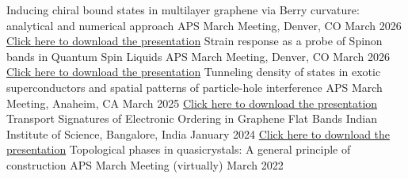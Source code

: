 \begin{cventries}
{Inducing chiral bound states in multilayer graphene via Berry curvature: analytical and numerical approach} %
{APS March Meeting, Denver, CO} %
{March 2026} %
{
}
	\vspace{-1.5mm}
	\cventry
{\href{https://drive.google.com/file/d/1M9ZYelGdC6XFK0UXrOCgbMAPBTpB8OEN/view?usp=sharing}{Click \underline{here} to download the presentation}} %
{Strain response as a probe of Spinon bands in Quantum Spin Liquids} %
{APS March Meeting, Denver, CO} %
{March 2026} %
{
}
	\vspace{-1.5mm}
	\cventry
{\href{https://docs.google.com/presentation/d/1f8SEl4IGaiwtxBs2p6rBDYGDNy4f1wdE_IzeY7EPmKs/edit?usp=sharing}{Click \underline{here} to download the presentation}} %
{Tunneling density of states in exotic superconductors and spatial patterns of particle-hole interference} %
{APS March Meeting, Anaheim, CA} %
{March 2025} %
{
}
	\vspace{-1.5mm}
	\cventry
	{\href{https://drive.google.com/file/d/1OpPcqvn78Uffwwdk_xJLz_MCEl7bEjHX/view?usp=sharing}{Click \underline{here} to download the presentation}} %
	{Transport Signatures of Electronic	Ordering in Graphene Flat Bands} %
	{Indian Institute of Science, Bangalore, India} %
	{January 2024} %
	{
	}
	\vspace{-1.5mm}
  \cventry
    {\href{https://drive.google.com/file/d/1HrlFGdNeFf5c6VuSyOaXjgsDxlA-f_bh/view?usp=sharing}{Click \underline{here} to download the presentation}} %
    {Topological phases in quasicrystals: A general principle of construction} %
    {APS March Meeting (virtually)} %
    {March 2022} %
    {
    }
	\vspace{-1.5mm}


\end{cventries}
